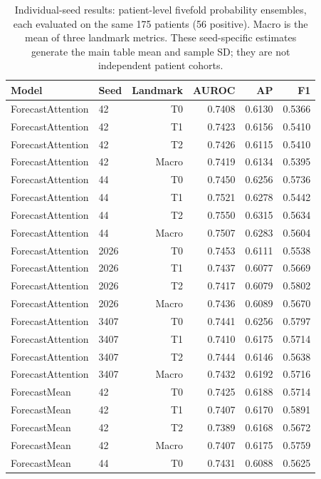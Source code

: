\begin{table}[t]
\centering
\small
\caption{Individual-seed results: patient-level fivefold probability ensembles, each evaluated on the same 175 patients (56 positive). Macro is the mean of three landmark metrics. These seed-specific estimates generate the main table mean and sample SD; they are not independent patient cohorts.}
\label{tab:seedresults_forecast}
\begin{tabular}{llrrrr}
\toprule
Model & Seed & Landmark & AUROC & AP & F1 \\
\midrule
ForecastAttention & 42 & T0 & 0.7408 & 0.6130 & 0.5366 \\
ForecastAttention & 42 & T1 & 0.7423 & 0.6156 & 0.5410 \\
ForecastAttention & 42 & T2 & 0.7426 & 0.6115 & 0.5410 \\
ForecastAttention & 42 & Macro & 0.7419 & 0.6134 & 0.5395 \\
ForecastAttention & 44 & T0 & 0.7450 & 0.6256 & 0.5736 \\
ForecastAttention & 44 & T1 & 0.7521 & 0.6278 & 0.5442 \\
ForecastAttention & 44 & T2 & 0.7550 & 0.6315 & 0.5634 \\
ForecastAttention & 44 & Macro & 0.7507 & 0.6283 & 0.5604 \\
ForecastAttention & 2026 & T0 & 0.7453 & 0.6111 & 0.5538 \\
ForecastAttention & 2026 & T1 & 0.7437 & 0.6077 & 0.5669 \\
ForecastAttention & 2026 & T2 & 0.7417 & 0.6079 & 0.5802 \\
ForecastAttention & 2026 & Macro & 0.7436 & 0.6089 & 0.5670 \\
ForecastAttention & 3407 & T0 & 0.7441 & 0.6256 & 0.5797 \\
ForecastAttention & 3407 & T1 & 0.7410 & 0.6175 & 0.5714 \\
ForecastAttention & 3407 & T2 & 0.7444 & 0.6146 & 0.5638 \\
ForecastAttention & 3407 & Macro & 0.7432 & 0.6192 & 0.5716 \\
ForecastMean & 42 & T0 & 0.7425 & 0.6188 & 0.5714 \\
ForecastMean & 42 & T1 & 0.7407 & 0.6170 & 0.5891 \\
ForecastMean & 42 & T2 & 0.7389 & 0.6168 & 0.5672 \\
ForecastMean & 42 & Macro & 0.7407 & 0.6175 & 0.5759 \\
ForecastMean & 44 & T0 & 0.7431 & 0.6088 & 0.5625 \\

\end{tabular}
\end{table}
